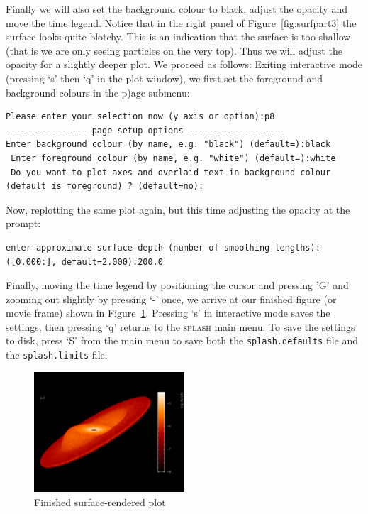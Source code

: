 \documentclass[a4paper,10pt]{article}
\newcommand{\splash}{\textsc{splash }}
\begin{document}
Finally we will also set the background colour to black, adjust the opacity and move the time legend. 
Notice that in the right panel of Figure~\ref{fig:surfpart3} the surface looks quite blotchy. This is an indication that the surface is too shallow (that is we are only seeing particles on the very top). Thus we will adjust the opacity for a slightly deeper plot. We proceed as follows: Exiting interactive mode (pressing `s' then `q' in the plot window), we first set the foreground and background colours in the p)age submenu:
\begin{verbatim}
Please enter your selection now (y axis or option):p8
---------------- page setup options -------------------
Enter background colour (by name, e.g. "black") (default=):black
 Enter foreground colour (by name, e.g. "white") (default=):white
 Do you want to plot axes and overlaid text in background colour (default is foreground) ? (default=no):
\end{verbatim}
Now, replotting the same plot again, but this time adjusting the opacity at the prompt:
\begin{verbatim}
enter approximate surface depth (number of smoothing lengths): ([0.000:], default=2.000):200.0
\end{verbatim}
 Finally, moving the time legend by positioning the cursor and pressing 'G' and zooming out slightly by pressing `-' once, we arrive at our finished figure (or movie frame) shown in Figure~\ref{fig:surfpartfinal}. Pressing `s' in interactive mode saves the settings, then pressing `q' returns to the \splash main menu. To save the settings to disk, press `S' from the main menu to save both the \verb+splash.defaults+ file and the \verb+splash.limits+ file.
\begin{figure}[h!]
\begin{center}
\includegraphics[width=0.5\textwidth]{surfpartfinal.png}
\caption{Finished surface-rendered plot}
\label{fig:surfpartfinal}
\end{center}
\end{figure}
 
\end{document}
